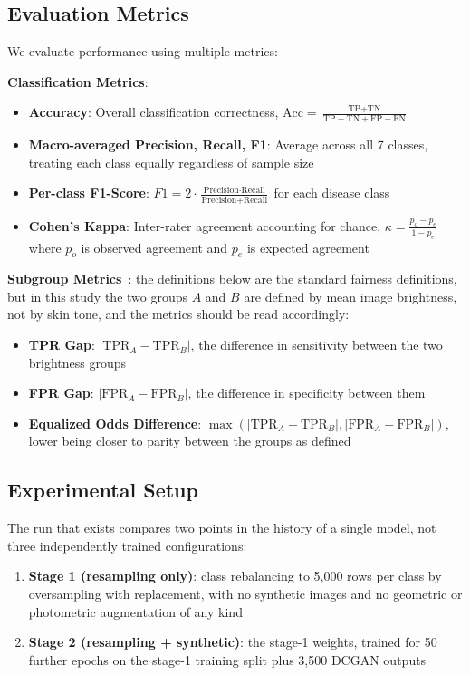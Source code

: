 \documentclass[ai,article,submit,pdftex,moreauthors]{Definitions/mdpi}
\begin{document}
\subsection{Evaluation Metrics}

We evaluate performance using multiple metrics:

\textbf{Classification Metrics}:
\begin{itemize}[leftmargin=*, itemsep=2pt]
    \item \textbf{Accuracy}: Overall classification correctness, $\text{Acc} = \frac{\text{TP} + \text{TN}}{\text{TP} + \text{TN} + \text{FP} + \text{FN}}$
    \item \textbf{Macro-averaged Precision, Recall, F1}: Average across all 7 classes, treating each class equally regardless of sample size
    \item \textbf{Per-class F1-Score}: $F1 = 2 \cdot \frac{\text{Precision} \cdot \text{Recall}}{\text{Precision} + \text{Recall}}$ for each disease class
    \item \textbf{Cohen's Kappa}: Inter-rater agreement accounting for chance, $\kappa = \frac{p_o - p_e}{1 - p_e}$ where $p_o$ is observed agreement and $p_e$ is expected agreement
\end{itemize}

\textbf{Subgroup Metrics}~\cite{hardt2016}: the definitions below are the standard fairness definitions, but in this study the two groups $A$ and $B$ are defined by mean image brightness, not by skin tone, and the metrics should be read accordingly:
\begin{itemize}[leftmargin=*, itemsep=2pt]
    \item \textbf{TPR Gap}: $|\text{TPR}_{A} - \text{TPR}_{B}|$, the difference in sensitivity between the two brightness groups
    \item \textbf{FPR Gap}: $|\text{FPR}_{A} - \text{FPR}_{B}|$, the difference in specificity between them
    \item \textbf{Equalized Odds Difference}: $\max(|\text{TPR}_{A} - \text{TPR}_{B}|, |\text{FPR}_{A} - \text{FPR}_{B}|)$, lower being closer to parity between the groups as defined
\end{itemize}

\subsection{Experimental Setup}

The run that exists compares two points in the history of a single model, not three independently trained configurations:
\begin{enumerate}[leftmargin=*, itemsep=2pt]
    \item \textbf{Stage 1 (resampling only)}: class rebalancing to 5,000 rows per class by oversampling with replacement, with no synthetic images and no geometric or photometric augmentation of any kind
    \item \textbf{Stage 2 (resampling + synthetic)}: the stage-1 weights, trained for 50 further epochs on the stage-1 training split plus 3,500 DCGAN outputs
\end{enumerate}
\end{document}
